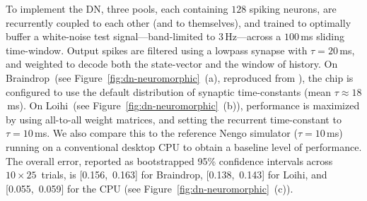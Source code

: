 To implement the DN, three pools, each containing $128$ spiking neurons, are recurrently coupled to each other (and to themselves), and trained to optimally buffer a white-noise test signal---band-limited to $3$\,Hz---across a $100$\,ms sliding time-window.
Output spikes are filtered using a lowpass synapse with $\tau = 20$\,ms, and weighted to decode both the state-vector and the window of history.
On Braindrop~(see Figure~\ref{fig:dn-neuromorphic}~(a), reproduced from \citet[][Figure~16]{braindrop2019}), the chip is configured to use the default distribution of synaptic time-constants (mean $\tau \approx 18$\,ms).
On Loihi~(see Figure~\ref{fig:dn-neuromorphic}~(b)), performance is maximized by using all-to-all weight matrices, and setting the recurrent time-constant to $\tau=10$\,ms.
We also compare this to the reference Nengo simulator ($\tau=10$\,ms) running on a conventional desktop CPU to obtain a baseline level of performance.
The overall error, reported as bootstrapped 95\% confidence intervals across $10 \times 25$~trials, is
[0.156,~0.163] for Braindrop,
[0.138,~0.143] for Loihi, and
[0.055,~0.059] for the CPU (see Figure~\ref{fig:dn-neuromorphic}~(c)).
